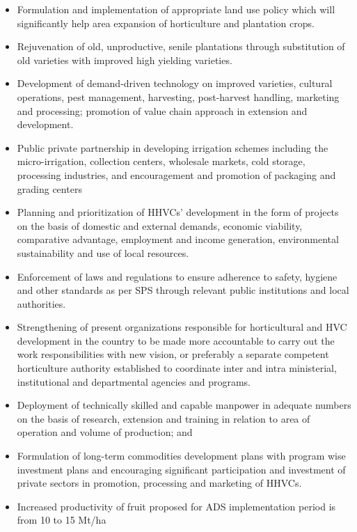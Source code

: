 \documentclass[
]{book}
\providecommand{\tightlist}{%
  \setlength{\itemsep}{0pt}\setlength{\parskip}{0pt}}
\begin{document}
\begin{itemize}
\tightlist
\item
  Formulation and implementation of appropriate land use policy which will significantly help area expansion of horticulture and plantation crops.
\item
  Rejuvenation of old, unproductive, senile plantations through substitution of old varieties with improved high yielding varieties.
\item
  Development of demand-driven technology on improved varieties, cultural operations, pest management, harvesting, post-harvest handling, marketing and processing; promotion of value chain approach in extension and development.
\item
  Public private partnership in developing irrigation schemes including the micro-irrigation, collection centers, wholesale markets, cold storage, processing industries, and encouragement and promotion of packaging and grading centers
\item
  Planning and prioritization of HHVCs' development in the form of projects on the basis of domestic and external demands, economic viability, comparative advantage, employment and income generation, environmental sustainability and use of local resources.
\item
  Enforcement of laws and regulations to ensure adherence to safety, hygiene and other standards as per SPS through relevant public institutions and local authorities.
\item
  Strengthening of present organizations responsible for horticultural and HVC development in the country to be made more accountable to carry out the work responsibilities with new vision, or preferably a separate competent horticulture authority established to coordinate inter and intra ministerial, institutional and departmental agencies and programs.
\item
  Deployment of technically skilled and capable manpower in adequate numbers on the basis of research, extension and training in relation to area of operation and volume of production; and
\item
  Formulation of long-term commodities development plans with program wise investment plans and encouraging significant participation and investment of private sectors in promotion, processing and marketing of HHVCs.
\item
  Increased productivity of fruit proposed for ADS implementation period is from 10 to 15 Mt/ha
\end{itemize}
\end{document}
